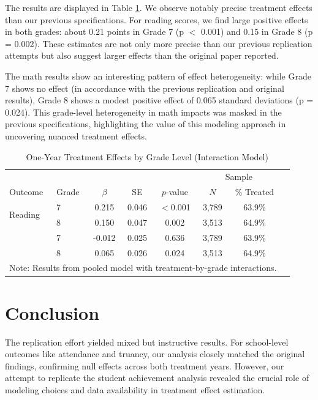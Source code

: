 \documentclass[11pt]{article}
\begin{document}
The results are displayed in Table \ref{tab:pooled-interact-results}. We observe
notably precise treatment effects than our
previous specifications. For reading scores, we find large positive effects in both
grades: about 0.21 points in Grade 7 (p $<$ 0.001) and 0.15 
in Grade 8 (p = 0.002). These estimates are not only more precise
than our previous replication attempts but also suggest larger effects than the
original paper reported.

The math results show an interesting pattern of effect heterogeneity: while
Grade 7 shows no effect (in accordance with the previous replication and
original results), Grade 8 shows a modest positive effect of 0.065 standard
deviations (p = 0.024). This
grade-level heterogeneity in math impacts was masked in the previous
specifications, highlighting the value of this modeling approach in uncovering
nuanced treatment effects.

\begin{table}[htbp]
\centering
\caption{One-Year Treatment Effects by Grade Level (Interaction Model)}
\label{tab:pooled-interact-results}
\begin{tabular}{llcccccc}
\toprule
& & & & & \multicolumn{2}{c}{Sample} \\
\cmidrule(lr){6-7}
Outcome & Grade & $\beta$ & SE & $p$-value & $N$ & \% Treated \\
\midrule
\multirow{2}{*}{Reading} 
& 7 & 0.215 & 0.046 & $<$0.001 & 3,789 & 63.9\% \\
& 8 & 0.150 & 0.047 & 0.002 & 3,513 & 64.9\% \\
\addlinespace[0.5em]
\multirow{2}{*}{Math}    
& 7 & -0.012 & 0.025 & 0.636 & 3,789 & 63.9\% \\
& 8 & 0.065 & 0.026 & 0.024 & 3,513 & 64.9\% \\
\bottomrule
\multicolumn{7}{l}{\small Note: Results from pooled model with treatment-by-grade interactions.} \\
\end{tabular}
\end{table}

\section{Conclusion}

The replication effort yielded mixed but instructive results. For school-level
outcomes like attendance and truancy, our analysis closely matched the original
findings, confirming null effects across both treatment years. However, our
attempt to replicate the student achievement analysis revealed the crucial role
of modeling choices and data availability in treatment effect estimation.
\end{document}
